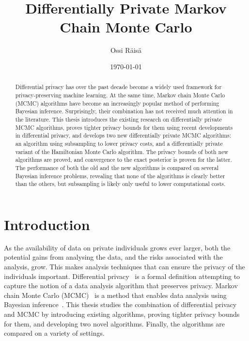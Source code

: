 \documentclass[english,twoside,openright]{HYgraduMLDS}
\title{Differentially Private Markov Chain Monte Carlo}
\author{Ossi Räisä}
\date{\today}
\begin{document}
\maketitle


\begin{abstract}
  Differential privacy has over the past decade become a widely used framework
  for privacy-preserving machine learning. At the same time,
  Markov chain Monte Carlo (MCMC) algorithms have become an increasingly popular method
  of performing Bayesian inference. Surprisingly, their combination has not
  received much attention in the literature. This thesis introduces the
  existing research on differentially private MCMC algorithms, proves tighter
  privacy bounds for them using recent developments in differential privacy, and
  develops two new differentially private MCMC algorithms:
  an algorithm using subsampling to lower privacy costs, and
  a differentially private variant of the Hamiltonian Monte
  Carlo algorithm. The privacy bounds of both new algorithms are proved, and
  convergence to the exact posterior is proven for the latter.
  The performance of both the old and the new algorithms is compared on several
  Bayesian inference problems, revealing that none of the algorithms is
  clearly better than the others, but subsampling is likely only useful to lower
  computational costs.
\end{abstract}

\mytableofcontents

\mynomenclature

\chapter{Introduction}

As the availability of data on private individuals grows ever larger, both the
potential gains from analysing the data, and the risks associated with the
analysis, grow. This makes analysis techniques that can ensure the privacy
of the individuals important. Differential
privacy~\cite{DMN06} is a formal definition attempting to capture the notion
of a data analysis algorithm that preserves privacy. Markov chain Monte
Carlo (MCMC)~\cite{MRR53, Has70} is a method that enables data analysis using
Bayesian inference~\cite{BDA}. This thesis studies the combination of
differential privacy and MCMC by introducing existing algorithms, proving
tighter privacy bounds for them, and developing two novel algorithms.
Finally, the algorithms are compared on a variety of settings.
\end{document}
